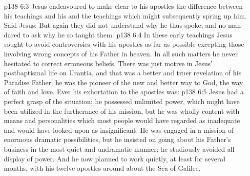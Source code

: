 \vs p138 6:3 \pc Jesus endeavoured to make clear to his apostles the difference between his teachings and his  and the teachings which might subsequently spring up  him. Said Jesus:  But again they did not understand why he thus spoke, and no man dared to ask why he so taught them.
\vs p138 6:4 In these early teachings Jesus sought to avoid controversies with his apostles as far as possible excepting those involving wrong concepts of his Father in heaven. In all such matters he never hesitated to correct erroneous beliefs. There was just  motive in Jesus’ postbaptismal life on Urantia, and that was a better and truer revelation of his Paradise Father; he was the pioneer of the new and better way to God, the way of faith and love. Ever his exhortation to the apostles was: 
\vs p138 6:5 Jesus had a perfect grasp of the situation; he possessed unlimited power, which might have been utilized in the furtherance of his mission, but he was wholly content with means and personalities which most people would have regarded as inadequate and would have looked upon as insignificant. He was engaged in a mission of enormous dramatic possibilities, but he insisted on going about his Father’s business in the most quiet and undramatic manner; he studiously avoided all display of power. And he now planned to work quietly, at least for several months, with his twelve apostles around about the Sea of Galilee.
